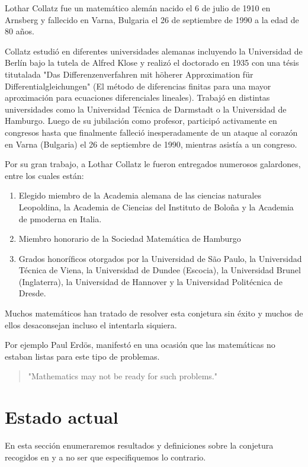 Lothar Collatz fue un matemático alemán nacido el 6 de julio de 1910 en Arnsberg y fallecido en Varna, Bulgaria el 26 de septiembre de 1990 a la edad de 80 años.

Collatz estudió en diferentes universidades alemanas incluyendo la Universidad de Berlín bajo la tutela de Alfred Klose y realizó el doctorado en 1935 con una tésis titutalada "Das Differenzenverfahren mit höherer Approximation für Differentialgleichungen" (El método de diferencias finitas para una mayor aproximación para ecuaciones diferenciales lineales).
Trabajó en distintas universidades como la Universidad Técnica de Darmstadt o la Universidad de Hamburgo. Luego de su jubilación como profesor, participó activamente en congresos hasta que finalmente falleció inesperadamente de un ataque al corazón en Varna (Bulgaria) el 26 de septiembre de 1990, mientras asistía a un congreso.

Por su gran trabajo, a Lothar Collatz le fueron entregados numerosos galardones, entre los cuales están:
\begin{enumerate}
    \item Elegido miembro de la Academia alemana de las ciencias naturales Leopoldina, la Academia de Ciencias del Instituto de Boloña y la Academia de pmoderna en Italia.
    \item Miembro honorario de la Sociedad Matemática de Hamburgo
    \item Grados honoríficos otorgados por la Universidad de São Paulo, la Universidad Técnica de Viena, la Universidad de Dundee (Escocia), la Universidad Brunel (Inglaterra), la Universidad de Hannover y la Universidad Politécnica de Dresde.
\end{enumerate}

Muchos matemáticos han tratado de resolver esta conjetura sin éxito y muchos de ellos desaconsejan incluso el intentarla siquiera.

Por ejemplo Paul Erdös, manifestó en una ocasión que las matemáticas no estaban listas para este tipo de problemas.
\begin{quote}
    "Mathematics may not be ready for such problems."
\end{quote}

\section{Estado actual}

En esta sección enumeraremos resultados y definiciones sobre la conjetura recogidos en \cite{lagariasAnnotatedBibliography1} y \cite{lagariasAnnotatedBibliography2} a no ser que especifiquemos lo contrario.



